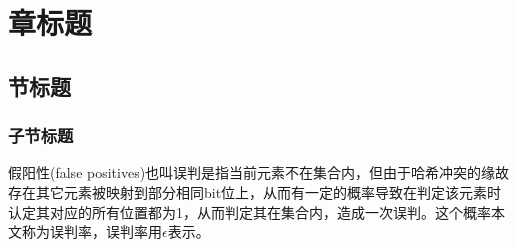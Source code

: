 \chapter{章标题}
\section{节标题}

\subsection{子节标题}

\begin{definition}
	假阳性(false positives)也叫误判是指当前元素不在集合内，但由于哈希冲突的缘故存在其它元素被映射到部分相同bit位上，从而有一定的概率导致在判定该元素时认定其对应的所有位置都为1，从而判定其在集合内，造成一次误判。这个概率本文称为误判率，误判率用\begin{math}\epsilon\end{math}表示。
\end{definition}



